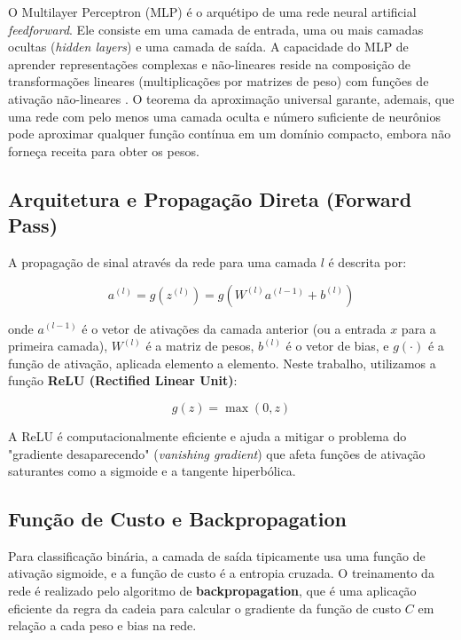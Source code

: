 \documentclass[12pt, a4paper, oneside]{report}
\begin{document}
O Multilayer Perceptron (MLP) é o arquétipo de uma rede neural artificial \textit{feedforward}. Ele consiste em uma camada de entrada, uma ou mais camadas ocultas (\textit{hidden layers}) e uma camada de saída. A capacidade do MLP de aprender representações complexas e não-lineares reside na composição de transformações lineares (multiplicações por matrizes de peso) com funções de ativação não-lineares \cite{rumelhart1986}. O teorema da aproximação universal \cite{cybenko1989} garante, ademais, que uma rede com pelo menos uma camada oculta e número suficiente de neurônios pode aproximar qualquer função contínua em um domínio compacto, embora não forneça receita para obter os pesos.

\subsection{Arquitetura e Propagação Direta (Forward Pass)}

A propagação de sinal através da rede para uma camada $l$ é descrita por:

\begin{equation}
    a^{(l)} = g(z^{(l)}) = g(W^{(l)} a^{(l-1)} + b^{(l)})
\end{equation}

onde $a^{(l-1)}$ é o vetor de ativações da camada anterior (ou a entrada $x$ para a primeira camada), $W^{(l)}$ é a matriz de pesos, $b^{(l)}$ é o vetor de bias, e $g(\cdot)$ é a função de ativação, aplicada elemento a elemento. Neste trabalho, utilizamos a função \textbf{ReLU (Rectified Linear Unit)}:

\begin{equation}
    g(z) = \max(0, z)
\end{equation}

A ReLU é computacionalmente eficiente e ajuda a mitigar o problema do "gradiente desaparecendo" (\textit{vanishing gradient}) que afeta funções de ativação saturantes como a sigmoide e a tangente hiperbólica.

\subsection{Função de Custo e Backpropagation}

Para classificação binária, a camada de saída tipicamente usa uma função de ativação sigmoide, e a função de custo é a entropia cruzada. O treinamento da rede é realizado pelo algoritmo de \textbf{backpropagation}, que é uma aplicação eficiente da regra da cadeia para calcular o gradiente da função de custo $C$ em relação a cada peso e bias na rede.
\end{document}

